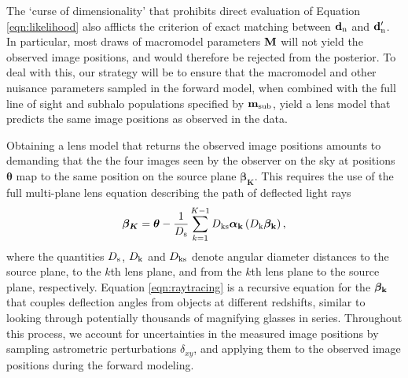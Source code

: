 The `curse of dimensionality' that prohibits direct evaluation of Equation \ref{eqn:likelihood} also afflicts the criterion of exact matching between ${\bf{d}_{\rm{n}}}$ and ${\bf{d}_{\rm{n}}^{\prime}}$. In particular, most draws of macromodel parameters ${\bf{M}}$ will not yield the observed image positions, and would therefore be rejected from the posterior. To deal with this, our strategy will be to ensure that the macromodel and other nuisance parameters sampled in the forward model, when combined with the full line of sight and subhalo populations specified by ${\bf{m}_{\rm{sub}}}$, yield a lens model that predicts the same image positions as observed in the data. 

Obtaining a lens model that returns the observed image positions amounts to demanding that the the four images seen by the observer on the sky at positions $\boldsymbol{\theta}$ map to the same position on the source plane $\boldsymbol{\beta_K}$. This requires the use of the full multi-plane lens equation describing the path of deflected light rays \cite[e.g.][]{Schnedier1997}
\begin{equation}
\label{eqn:raytracing}
\boldsymbol{\beta_K} = \boldsymbol{\theta} - \frac{1}{D_{\rm{s}}} \sum_{k=1}^{K-1} D_{\rm{ks}}{\boldsymbol{\alpha_{\rm{k}}}} \left(D_{\rm{k}} \boldsymbol{\beta_{\rm{k}}}\right),
\end{equation} 
where the quantities $D_{\rm{s}}$, $D_{\rm{k}}$ and $D_{\rm{ks}}$ denote angular diameter distances to the source plane, to the $k$th lens plane, and from the $k$th lens plane to the source plane, respectively. Equation \ref{eqn:raytracing} is a recursive equation for the $\boldsymbol{\beta_{\rm{k}}}$ that couples deflection angles from objects at different redshifts, similar to looking through potentially thousands of magnifying glasses in series. Throughout this process, we account for uncertainties in the measured image positions by sampling astrometric perturbations $\delta_{xy}$, and applying them to the observed image positions during the forward modeling.

